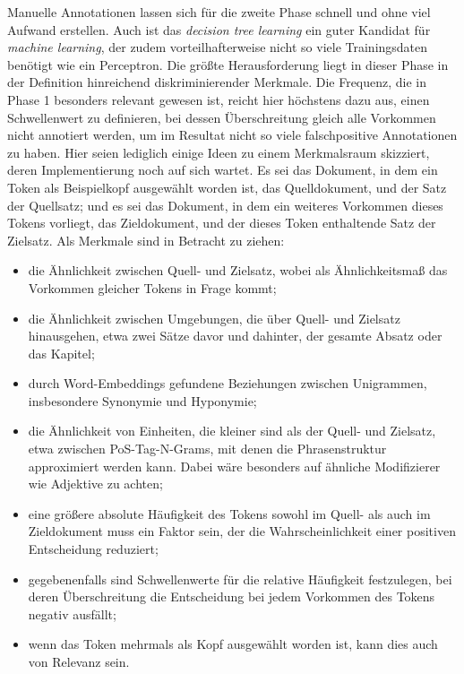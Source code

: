 \documentclass{article}
\newcommand*{\englisch}[1]{\foreignlanguage{english}{\textit{#1}}}%
\begin{document}
Manuelle Annotationen lassen sich für die zweite Phase schnell und
ohne viel Aufwand erstellen. Auch ist das \englisch{decision tree
  learning} ein guter Kandidat für \textit{machine learning}, der zudem
vorteilhafterweise nicht so viele Trainingsdaten benötigt wie ein
Perceptron. Die größte Herausforderung liegt in dieser Phase in der
Definition hinreichend diskriminierender Merkmale. Die Frequenz, die
in Phase 1 besonders relevant gewesen ist, reicht hier höchstens dazu
aus, einen Schwellenwert zu definieren, bei dessen Überschreitung
gleich alle Vorkommen nicht annotiert werden, um im Resultat nicht so
viele falschpositive Annotationen zu haben. Hier seien lediglich
einige Ideen zu einem Merkmalsraum skizziert, deren Implementierung
noch auf sich wartet. Es sei das Dokument, in dem ein Token als
Beispielkopf ausgewählt worden ist, das Quelldokument, und der Satz
der Quellsatz; und es sei das Dokument, in dem ein weiteres Vorkommen
dieses Tokens vorliegt, das Zieldokument, und der dieses Token
enthaltende Satz der Zielsatz. Als Merkmale sind in Betracht zu ziehen:
\begin{itemize}
\item die Ähnlichkeit zwischen Quell- und Zielsatz, wobei als
  Ähnlichkeitsmaß das Vorkommen gleicher Tokens in Frage kommt;
\item die Ähnlichkeit zwischen Umgebungen, die über Quell- und
  Zielsatz hinausgehen, etwa zwei Sätze davor und dahinter, der
  gesamte Absatz oder das Kapitel;
\item durch Word-Embeddings gefundene Beziehungen zwischen Unigrammen,
  insbesondere Synonymie und Hyponymie;
\item die Ähnlichkeit von Einheiten, die kleiner sind als der Quell-
  und Zielsatz, etwa zwischen PoS-Tag-N-Grams, mit denen die
  Phrasenstruktur approximiert werden kann. Dabei wäre besonders auf
  ähnliche Modifizierer wie Adjektive zu achten;
\item eine größere absolute Häufigkeit des Tokens sowohl im Quell- als
  auch im Zieldokument muss ein Faktor sein, der die
  Wahrscheinlichkeit einer positiven Entscheidung reduziert;
\item gegebenenfalls sind Schwellenwerte für die relative Häufigkeit
  festzulegen, bei deren Überschreitung die Entscheidung bei jedem
  Vorkommen des Tokens negativ ausfällt;
\item wenn das Token mehrmals als Kopf ausgewählt worden ist, kann
  dies auch von Relevanz sein.
\end{itemize}
\end{document}
